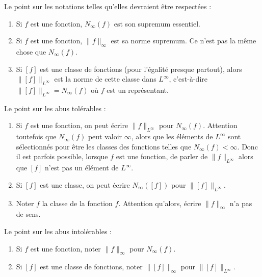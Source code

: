 \begin{normaltext}
	Le point sur les notations telles qu'elles devraient être respectées :
	\begin{enumerate}
		\item
		      Si \( f\) est une fonction, \( N_{\infty}(f)\) est son supremum essentiel.
		\item
		      Si \( f\) est une fonction, \( \| f \|_{\infty}\) est sa norme supremum. Ce n'est pas la même chose que \( N_{\infty}(f)\).
		\item
		      Si \( [f]\) est une classe de fonctions (pour l'égalité presque partout), alors \( \| [f] \|_{L^{\infty}}\) est la norme de cette classe dans \( L^{\infty}\), c'est-à-dire \( \| [f] \|_{L^{\infty}}=N_{\infty}(f)\) où \( f\) est un représentant.
	\end{enumerate}
	Le point sur les abus tolérables :
	\begin{enumerate}
		\item
		      Si \( f\) est une fonction, on peut écrire \( \| f \|_{L^{\infty}}\) pour \( N_{\infty}(f)\). Attention toutefois que \( N_{\infty}(f)\) peut valoir \( \infty\), alors que les éléments de \( L^{\infty}\) sont sélectionnés pour être les classes des fonctions telles que \( N_{\infty}(f)<\infty\). Donc il est parfois possible, lorsque \( f\) est une fonction, de parler de \( \| f \|_{L^{\infty}}\) alors que \( [f]\) n'est pas un élément de \( L^{\infty}\).
		\item
		      Si \( [f]\) est une classe, on peut écrire \( N_{\infty}([f])\) pour \( \| [f] \|_{L^{\infty}}\).
		\item
		      Noter \( f\) la classe de la fonction \( f\). Attention qu'alors, écrire \( \| f \|_{\infty}\) n'a pas de sens.
	\end{enumerate}
	Le point sur les abus intolérables :
	\begin{enumerate}
		\item
		      Si \( f\) est une fonction, noter \( \| f \|_{\infty}\) pour \( N_{\infty}(f)\).
		\item
		      Si \( [f]\) est une classe de fonctions, noter \( \| [f] \|_{\infty}\) pour \( \| [f] \|_{L^{\infty}}\).
	\end{enumerate}
\end{normaltext}

